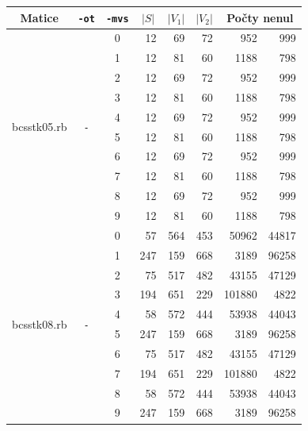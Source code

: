\documentclass[11pt,american,czech,oneside]{book}
\theoremstyle{plain}
\theoremstyle{definition}
\begin{document}
\bigskip
{\noindent
  \footnotesize
  \centering
  \renewcommand{\arraystretch}{1.1}
\begin{tabular}{|l|c|c|r|r|r|r|r|}
  \hline
  \multicolumn{1}{|c|}{Matice} & \multicolumn{1}{|c|}{\texttt{-ot}}  &\multicolumn{1}{|c|}{\texttt{-mvs}} &\multicolumn{1}{|c|}{$|S|$} & \multicolumn{1}{|c|}{$|V_1|$}& \multicolumn{1}{|c|}{$|V_2|$} & \multicolumn{2}{c|}{Počty nenul} \\
  \hline
    \multirow{10}{*}{bcsstk05.rb}
      & \multirow{10}{*}{\texttt{-}} & 0
      & 12	&	69	&	72	& 952 & 999 \\
      & & 1 
      &	12	&	81	&	60	&	1188	&	798	\\
      & & 2
      &	12	&	69	&	72	&	952	&	999	\\
      & & 3
      &	12	&	81	&	60	&	1188	&	798	\\
      & & 4
      &	12	&	69	&	72	&	952	&	999	\\
      & & 5
      &	12	&	81	&	60	&	1188	&	798	\\
      & & 6
      &	12	&	69	&	72	&	952	&	999	\\
      & & 7
      &	12	&	81	&	60	&	1188	&	798	\\
      & & 8
      &	12	&	69	&	72	&	952	&	999	\\
      & & 9
      &	12	&	81	&	60	&	1188	&	798	\\
    \hline
    \multirow{10}{*}{bcsstk08.rb}
      & \multirow{10}{*}{\texttt{-}} & 0
      & 57  & 564 & 453 &	50962	&	44817 \\
      & & 1 
      &	247	&	159	&	668	&	3189	&	96258	\\
      & & 2
      &	75	&	517	&	482	&	43155	&	47129	\\
      & & 3
      &	194	&	651	&	229	&	101880	&	4822	\\
      & & 4
      &	58	&	572	&	444	&	53938	&	44043	\\
      & & 5
      &	247	&	159	&	668	&	3189	&	96258	\\
      & & 6
      &	75	&	517	&	482	&	43155	&	47129	\\
      & & 7
      &	194	&	651	&	229	&	101880	&	4822	\\
      & & 8
      &	58	&	572	&	444	&	53938	&	44043	\\
      & & 9
      &	247	&	159	&	668	&	3189	&	96258	\\
  \hline
\end{tabular}
}
\bigskip
\end{document}
